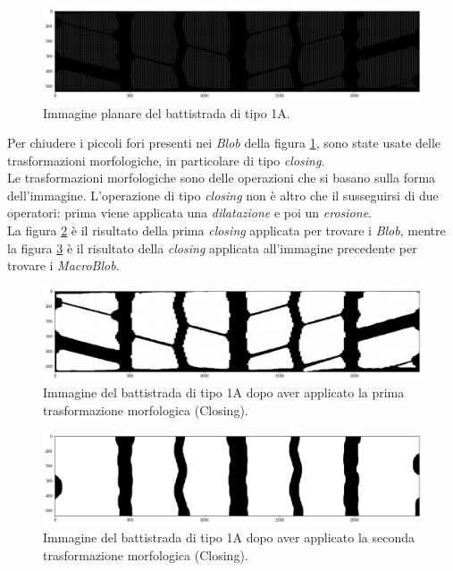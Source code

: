 \begin{figure}[H]
	\centering
	\includegraphics[width=0.9\columnwidth]{./pictures/batt_1a_analisi_6.png}
	\caption{Immagine planare del battistrada di tipo 1A.}\label{fig:batt_1a_analisi_6}
\end{figure}

\noindent Per chiudere i piccoli fori presenti nei \textit{Blob} della figura \ref{fig:batt_1a_analisi_6}, sono state usate delle trasformazioni morfologiche, in particolare di tipo \textit{closing}.\\
\newline
Le trasformazioni morfologiche sono delle operazioni che si basano sulla forma dell'immagine. L'operazione di tipo \textit{closing} non è altro che il susseguirsi di due operatori: prima viene applicata una \textit{dilatazione} e poi un \textit{erosione}.\\
La figura \ref{fig:batt_1a_analisi_7} è il risultato della prima \textit{closing} applicata per trovare i \textit{Blob}, mentre la figura \ref{fig:batt_1a_analisi_8} è il risultato della \textit{closing} applicata all'immagine precedente per trovare i \textit{MacroBlob}.\\

\begin{figure}[H]
	\centering
	\includegraphics[width=0.9\columnwidth]{./pictures/batt_1a_analisi_7.png}
	\caption{Immagine del battistrada di tipo 1A dopo aver applicato la prima trasformazione morfologica (Closing).}\label{fig:batt_1a_analisi_7}
\end{figure}

\begin{figure}[H]
	\centering
	\includegraphics[width=0.9\columnwidth]{./pictures/batt_1a_analisi_8.png}
	\caption{Immagine del battistrada di tipo 1A dopo aver applicato la seconda trasformazione morfologica (Closing).}\label{fig:batt_1a_analisi_8}
\end{figure}

